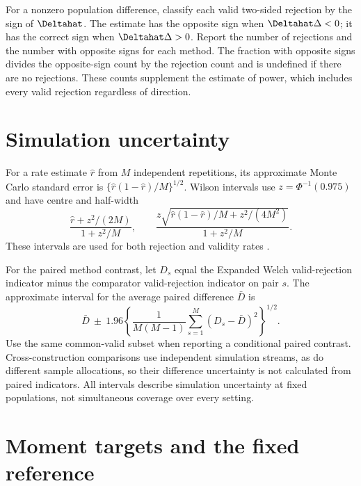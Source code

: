 For a nonzero population difference, classify each valid two-sided rejection
by the sign of \(\Deltahat\). The estimate has the opposite sign when
\(\Deltahat\Delta<0\); it has the correct sign when
\(\Deltahat\Delta>0\). Report the number of rejections and the
number with opposite signs for each method. The fraction with opposite
signs divides the opposite-sign count by the rejection count and is undefined
if there are no rejections. These counts supplement the estimate of power,
which includes every valid rejection regardless of direction.

\section{Simulation uncertainty}
\label{sec:simulation-uncertainty}

For a rate estimate \(\widehat r\) from \(M\) independent repetitions,
its approximate Monte Carlo standard error is
\(\{\widehat r(1-\widehat r)/M\}^{1/2}\).
Wilson intervals use \(z=\Phi^{-1}(0.975)\) and have centre and
half-width
\begin{equation}
 \frac{\widehat r+z^2/(2M)}{1+z^2/M},
 \qquad
 \frac{z\sqrt{\widehat r(1-\widehat r)/M+z^2/(4M^2)}}{1+z^2/M}.
\end{equation}
These intervals are used for both rejection and validity rates
\citep{wilson1927}.

For the paired method contrast, let \(D_s\) equal the Expanded Welch
valid-rejection indicator minus the comparator
valid-rejection indicator on pair \(s\). The approximate interval for the average paired difference
\(\bar D\) is
\begin{equation}
 \bar D\ \pm\ 1.96
 \left\{\frac{1}{M(M-1)}\sum_{s=1}^M(D_s-\bar D)^2\right\}^{1/2}.
\end{equation}
Use the same common-valid subset when reporting a conditional paired
contrast. Cross-construction comparisons use independent simulation
streams, as do different sample allocations, so their difference uncertainty is not calculated from paired
indicators. All intervals describe simulation uncertainty at fixed
populations, not simultaneous coverage over every setting.


\section{Moment targets and the fixed reference}
\label{sec:moment-reference-details}

